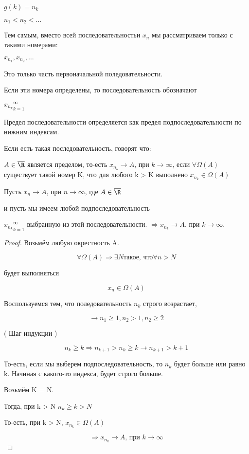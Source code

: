 $g(k) = n_k$

$n_1 < n_2 < \dots $

Тем самым, вместо всей последовательностьи $x_n$ мы рассматриваем только с такими номерами:

$x_{n_1}, x_{n_2}, \dots$

Это только часть первоначальной поледовательности.

\begin{notation}
Если эти номера определены, то последовательность обозначают

${x_{n_k}}_{k=1}^\infty$


\end{notation}

Предел последовательности определяется как предел подпоследовательности по нижним индексам.

Если есть такая последовательность, говорят что:

$ A \in \overline{\R} $ является пределом, то-есть $x_{n_k} \to A$, при $k \to \infty$, если $\forall \Omega (A)$ существует такой номер K, что для любого k > K выполнено $x_{n_k} \in \Omega (A)$


\begin {theorem}

Пусть $x_n \to A$, при $n \to \infty$, где $A \in \overline \R$

и пусть мы имеем любой подпоследовательность 

${x_{n_k}}_{k=1}^\infty$ выбранную из этой последовательности. $\Rightarrow x_{n_k} \to A$, при $k \to \infty$.



\end{theorem}

\begin{proof}
    Возьмём любую окрестность A.

    \[ \forall \Omega (A) \Rightarrow \exists N \text{такое, что} \forall n > N \]

    будет выполняться

    \[ x_n \in \Omega (A) \]

    Воспользуемся тем, что поледовательность $n_k$ строго возрастает, 

    \[ \rightarrow n_1 \geq 1, n_2 > 1, n_2 \geq 2 \]

    ( Шаг индукции )

    \[n_k \geq k \Rightarrow n_{k + 1} > n_k \geq k \rightarrow n_{k + 1} > k+1\]

    То-есть, если мы выберем подпоследовательность, то $n_k$ будет больше или равно k. Начиная с какого-то индекса, будет строго больше.
    
    Возьмём K = N.

    Тогда, при k > N $n_k \geq k > N$

    То-есть, при k > N, $x_{n_k} \in \Omega (A)$

    \[\Rightarrow x_{n_k} \to A \text{, при $k \to \infty$} \]
\end{proof}